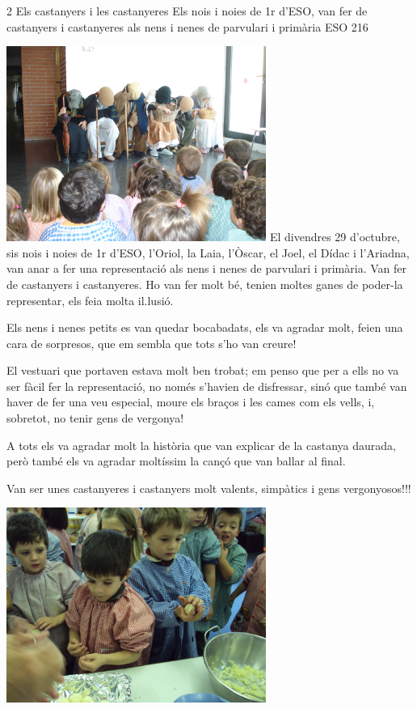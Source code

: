 \newpage

\begin{news}
{2} %
{Els castanyers i les castanyeres}
{Els nois i noies de 1r d’ESO,  van fer de castanyers i castanyeres als nens i nenes de parvulari i primària}
{ESO}
{216} %


\noindent\includegraphics[width=8.5cm,keepaspectratio]{parvulari/img/castanyada_fiotos012.jpg}
El divendres  29 d’octubre,  sis nois i noies de 1r d’ESO,  l’Oriol, la Laia, l’Òscar, el Joel, el Dídac i l’Ariadna,  van anar a fer una representació als nens i nenes de parvulari i primària. Van fer de castanyers i castanyeres. Ho van fer molt bé, tenien moltes ganes de poder-la representar, els feia molta il.lusió.

Els nens i nenes petits es van quedar bocabadats, els va agradar molt, feien una cara de sorpresos, que em sembla que tots s’ho van creure!

El vestuari que portaven estava molt ben trobat; em penso que per a ells no va ser fàcil fer la representació, no només s’havien de disfressar, sinó que també van haver de fer una veu especial, moure els braços i les cames com els vells, i, sobretot, no tenir gens de vergonya! 

A tots els va agradar molt la història que van explicar de la castanya daurada, però també els va agradar moltíssim la cançó que van ballar al final.

Van ser unes castanyeres i castanyers molt valents, simpàtics i gens vergonyosos!!!

\noindent\includegraphics[width=8.5cm,keepaspectratio]{parvulari/img/castanyada_DSC00666.JPG}


\end{news}
